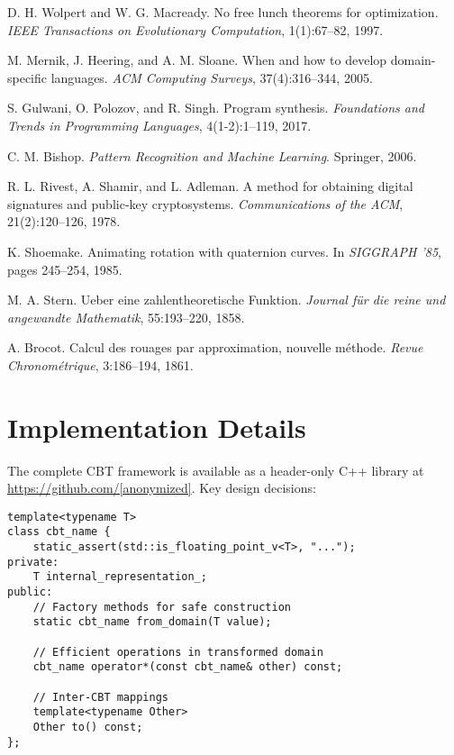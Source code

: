 \documentclass[12pt,a4paper]{article}
\theoremstyle{definition}
\begin{document}
\begin{thebibliography}{99}
D. H. Wolpert and W. G. Macready.
\newblock No free lunch theorems for optimization.
\newblock \emph{IEEE Transactions on Evolutionary Computation}, 1(1):67--82, 1997.

M. Mernik, J. Heering, and A. M. Sloane.
\newblock When and how to develop domain-specific languages.
\newblock \emph{ACM Computing Surveys}, 37(4):316--344, 2005.

S. Gulwani, O. Polozov, and R. Singh.
\newblock Program synthesis.
\newblock \emph{Foundations and Trends in Programming Languages}, 4(1-2):1--119, 2017.

C. M. Bishop.
\newblock \emph{Pattern Recognition and Machine Learning}.
\newblock Springer, 2006.

R. L. Rivest, A. Shamir, and L. Adleman.
\newblock A method for obtaining digital signatures and public-key cryptosystems.
\newblock \emph{Communications of the ACM}, 21(2):120--126, 1978.

K. Shoemake.
\newblock Animating rotation with quaternion curves.
\newblock In \emph{SIGGRAPH '85}, pages 245--254, 1985.

M. A. Stern.
\newblock Ueber eine zahlentheoretische Funktion.
\newblock \emph{Journal f\"ur die reine und angewandte Mathematik}, 55:193--220, 1858.

A. Brocot.
\newblock Calcul des rouages par approximation, nouvelle m\'ethode.
\newblock \emph{Revue Chronom\'etrique}, 3:186--194, 1861.

\end{thebibliography}

\appendix

\section{Implementation Details}

The complete CBT framework is available as a header-only C++ library at \url{https://github.com/[anonymized]}. Key design decisions:

\begin{lstlisting}[caption={CBT design pattern}]
template<typename T>
class cbt_name {
    static_assert(std::is_floating_point_v<T>, "...");
private:
    T internal_representation_;
public:
    // Factory methods for safe construction
    static cbt_name from_domain(T value);
    
    // Efficient operations in transformed domain
    cbt_name operator*(const cbt_name& other) const;
    
    // Inter-CBT mappings
    template<typename Other>
    Other to() const;
};
\end{lstlisting}
\end{document}
